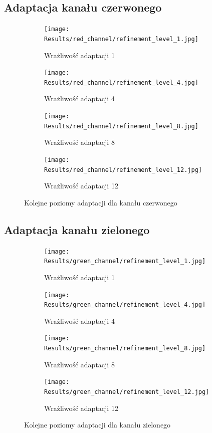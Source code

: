 \documentclass{article}
\begin{document}
\subsection{Adaptacja kanału czerwonego}

\begin{figure}[H]
    \centering
    \begin{subfigure}[b]{0.45\textwidth}
        \texttt{[image: Results/red\_channel/refinement\_level\_1.jpg]}
        \caption{Wrażliwość adaptacji 1}
    \end{subfigure}
    \begin{subfigure}[b]{0.45\textwidth}
        \texttt{[image: Results/red\_channel/refinement\_level\_4.jpg]}
        \caption{Wrażliwość adaptacji 4}
    \end{subfigure}
    \begin{subfigure}[b]{0.45\textwidth}
        \texttt{[image: Results/red\_channel/refinement\_level\_8.jpg]}
        \caption{Wrażliwość adaptacji 8}
    \end{subfigure}
    \begin{subfigure}[b]{0.45\textwidth}
        \texttt{[image: Results/red\_channel/refinement\_level\_12.jpg]}
        \caption{Wrażliwość adaptacji 12}
    \end{subfigure}
    \caption{Kolejne poziomy adaptacji dla kanału czerwonego}
    \label{fig:red-channel-levels}
\end{figure}

\subsection{Adaptacja kanału zielonego}

\begin{figure}[H]
    \centering
    \begin{subfigure}[b]{0.45\textwidth}
        \texttt{[image: Results/green\_channel/refinement\_level\_1.jpg]}
        \caption{Wrażliwość adaptacji 1}
    \end{subfigure}
    \begin{subfigure}[b]{0.45\textwidth}
        \texttt{[image: Results/green\_channel/refinement\_level\_4.jpg]}
        \caption{Wrażliwość adaptacji 4}
    \end{subfigure}
    \begin{subfigure}[b]{0.45\textwidth}
        \texttt{[image: Results/green\_channel/refinement\_level\_8.jpg]}
        \caption{Wrażliwość adaptacji 8}
    \end{subfigure}
    \begin{subfigure}[b]{0.45\textwidth}
        \texttt{[image: Results/green\_channel/refinement\_level\_12.jpg]}
        \caption{Wrażliwość adaptacji 12}
    \end{subfigure}
    \caption{Kolejne poziomy adaptacji dla kanału zielonego}
    \label{fig:green-channel-levels}
\end{figure}
\end{document}
